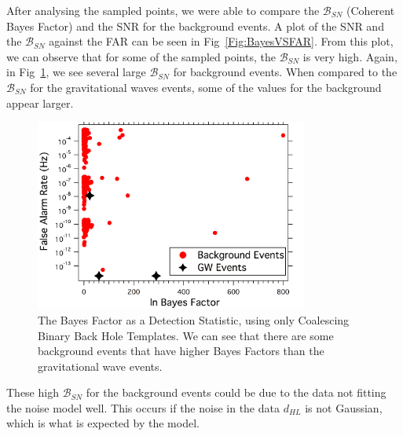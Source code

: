 \documentclass{article}
\begin{document}
   
 
 After analysing the sampled points, we were able to compare the $\mathcal{B}_{SN}$ (Coherent Bayes Factor)  and the SNR for the background events. A plot of the SNR and the $\mathcal{B}_{SN}$ against the FAR can be seen in Fig~\ref{Fig:BayesVSFAR}. From this plot, we can observe that for some of the sampled points, the $\mathcal{B}_{SN}$ is very high. Again, in Fig~\ref{Fig:FARvsBayesFactor}, we see several large $\mathcal{B}_{SN}$ for background events. When compared to the $\mathcal{B}_{SN}$ for the gravitational waves events, some of the values for the background appear larger. \\
 
 
  
  \begin{figure}[h]
  	\centering
  	\includegraphics[width=0.8\textwidth]{Figures/FARvsBayesFactor.png} 
  	\caption{The Bayes Factor as a Detection Statistic, using only Coalescing Binary Back Hole Templates. We can see that there are some background events that have higher Bayes Factors than the gravitational wave events.} 
  	\label{Fig:FARvsBayesFactor}
  \end{figure}
  
  
 
 
 
 These high $\mathcal{B}_{SN}$ for the background events could be due to the data not fitting the noise model well. This occurs if the noise in the data $d_{HL}$ is not Gaussian, which is what is expected by the model.\\
 
\end{document}
